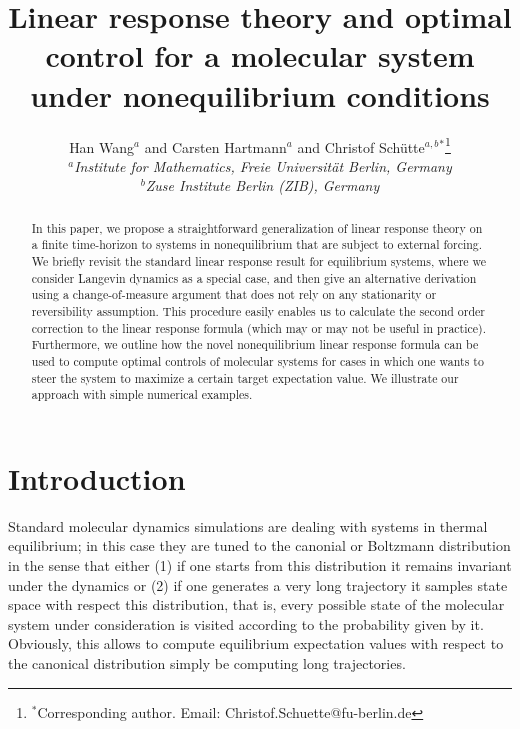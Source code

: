 \documentclass[]{tMPH2e}
\begin{document}
\title{Linear response theory and optimal control for a molecular system under nonequilibrium conditions}

\author{Han Wang$^{a}$ and Carsten Hartmann$^{a}$ and Christof Sch\"utte$^{a,b}$$^{\ast}$\thanks{$^\ast$Corresponding author. Email: Christof.Schuette@fu-berlin.de}\\\vspace{6pt}$^{a}${\em Institute for Mathematics, Freie Universit\"at Berlin, Germany}\\$^{b}${\em Zuse Institute Berlin (ZIB), Germany}}
  


\maketitle

\begin{abstract}
  In this paper, we propose a straightforward generalization of linear response theory on a finite time-horizon to systems in nonequilibrium that are subject to external forcing.  We briefly revisit the standard linear response result for equilibrium systems, where we consider Langevin dynamics as a special case, and then give an alternative derivation using a change-of-measure argument that does not rely on any stationarity or reversibility assumption. This procedure easily enables us to calculate the second order correction to the linear response formula (which may or may not be useful in practice). Furthermore, we outline how the novel nonequilibrium linear response formula can be used to compute optimal controls of molecular systems for cases in which one wants to steer the system to maximize a certain target expectation value. We illustrate our approach with simple numerical examples. 
\end{abstract}


\section{Introduction}

Standard molecular dynamics simulations are dealing with systems in thermal equilibrium; in this case they are tuned to the canonial or Boltzmann distribution in the sense that either (1) if one starts from this distribution it remains invariant under the dynamics or (2) if one generates a very long trajectory it samples state space with respect this distribution, that is, every possible state of the molecular system under consideration is visited according to the probability given by it.  Obviously, this allows to compute equilibrium expectation values with respect to the  canonical distribution simply be computing long trajectories. 
\end{document}
